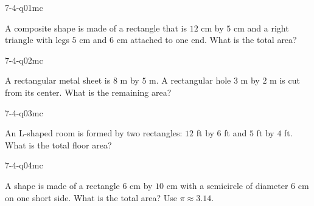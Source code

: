 

\begin{practiceQuestion}{7-4-q01}{mc}
\begin{questionText}
A composite shape is made of a rectangle that is $12$ cm by $5$ cm and a right triangle with legs $5$ cm and $6$ cm attached to one end. What is the total area?
\end{questionText}
\end{practiceQuestion}

\begin{practiceQuestion}{7-4-q02}{mc}
\begin{questionText}
A rectangular metal sheet is $8$ m by $5$ m. A rectangular hole $3$ m by $2$ m is cut from its center. What is the remaining area?
\end{questionText}
\end{practiceQuestion}

\begin{practiceQuestion}{7-4-q03}{mc}
\begin{questionText}
An L-shaped room is formed by two rectangles: $12$ ft by $6$ ft and $5$ ft by $4$ ft. What is the total floor area?
\end{questionText}
\end{practiceQuestion}

\begin{practiceQuestion}{7-4-q04}{mc}
\begin{questionText}
A shape is made of a rectangle $6$ cm by $10$ cm with a semicircle of diameter $6$ cm on one short side. What is the total area? Use $\pi \approx 3.14$.
\end{questionText}
\end{practiceQuestion}

